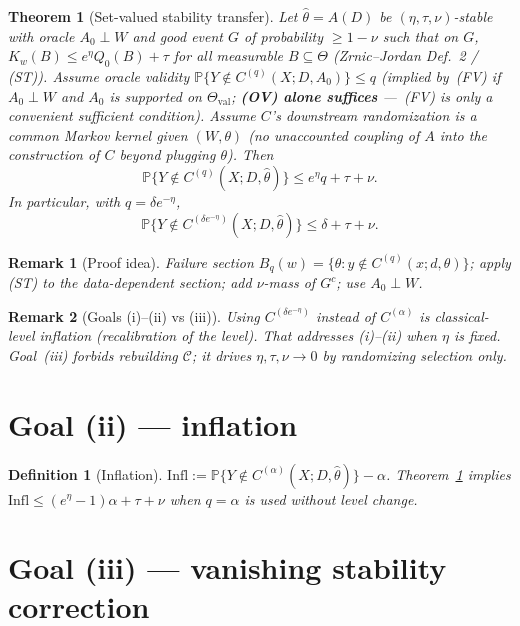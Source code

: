 \documentclass[11pt]{article}
\newtheorem{definition}{Definition}
\newtheorem{theorem}{Theorem}
\newtheorem{remark}{Remark}
\begin{document}
\begin{theorem}[Set-valued stability transfer]
\label{thm:set-valued}
Let $\hat\theta=A(D)$ be $(\eta,\tau,\nu)$-stable with oracle $A_0\perp W$ and
good event $G$ of probability $\ge 1-\nu$ such that on $G$,
$K_w(B)\le e^\eta Q_0(B)+\tau$ for all measurable $B\subseteq\Theta$
(Zrnic--Jordan Def.~2 / (ST)).
Assume oracle validity
$\mathbb{P}\{Y\notin C^{(q)}(X;D,A_0)\}\le q$
(implied by~(FV) if $A_0\perp W$ and $A_0$ is supported on $\Theta_{\mathrm{val}}$;
\textbf{(OV) alone suffices} ---~(FV) is only a convenient sufficient condition).
Assume $C$'s downstream randomization is a common Markov kernel given $(W,\theta)$
(no unaccounted coupling of $A$ into the construction of $C$ beyond plugging $\theta$).
Then
\[
\mathbb{P}\bigl\{Y\notin C^{(q)}(X;D,\hat\theta)\bigr\}
\le e^\eta q+\tau+\nu.
\]
In particular, with $q=\delta e^{-\eta}$,
\[
\mathbb{P}\bigl\{Y\notin C^{(\delta e^{-\eta})}(X;D,\hat\theta)\bigr\}
\le \delta+\tau+\nu.
\]
\end{theorem}

\begin{remark}[Proof idea]
Failure section $B_q(w)=\{\theta:y\notin C^{(q)}(x;d,\theta)\}$; apply (ST) to the
data-dependent section; add $\nu$-mass of $G^c$; use $A_0\perp W$.
\end{remark}

\begin{remark}[Goals (i)--(ii) vs (iii)]
Using $C^{(\delta e^{-\eta})}$ instead of $C^{(\alpha)}$ is classical-level inflation
(recalibration of the \emph{level}). That addresses (i)--(ii) when $\eta$ is fixed.
Goal~(iii) forbids rebuilding $\mathcal{C}$; it drives $\eta,\tau,\nu\to 0$ by
randomizing \emph{selection} only.
\end{remark}

\section{Goal (ii) --- inflation}

\begin{definition}[Inflation]
$\mathrm{Infl}:=\mathbb{P}\{Y\notin C^{(\alpha)}(X;D,\hat\theta)\}-\alpha$.
Theorem~\ref{thm:set-valued} implies
$\mathrm{Infl}\le (e^\eta-1)\alpha+\tau+\nu$ when $q=\alpha$ is used without level change.
\end{definition}

\section{Goal (iii) --- vanishing stability correction}
\end{document}
